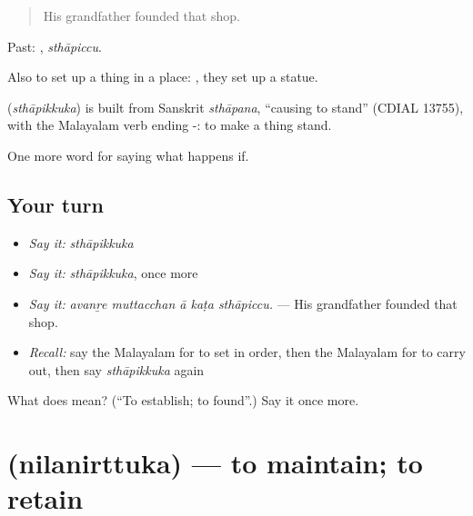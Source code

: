 \begin{quote}
His grandfather founded that shop.
\end{quote}

Past: , \emph{sthāpiccu}.

Also to set up a thing in a place:  , they set up a statue.

\begin{cousinweb}
\textbf{} (\emph{sthāpikkuka}) is built from Sanskrit \emph{sthāpana}, \textquotedblleft{}causing to stand\textquotedblright{} (CDIAL 13755), with the Malayalam verb ending -: to make a thing stand.
\end{cousinweb}

\begin{grammarlens}[title={What you've built}]
One more word for saying what happens if.
\end{grammarlens}

\subsection*{Your turn}
\begin{itemize}
\raggedright
  \item \emph{Say it:} \emph{sthāpikkuka}
  \item \emph{Say it:} \emph{sthāpikkuka}, once more
  \item \emph{Say it:} \emph{avanṟe muttacchan ā kaṭa sthāpiccu.} — His grandfather founded that shop.
  \item \emph{Recall:} say the Malayalam for to set in order, then the Malayalam for to carry out, then say \emph{sthāpikkuka} again
\end{itemize}

\begin{tcolorbox}[breakable,colback=teal!4,colframe=teal!35!black,title={Before you move on}]
What does  mean? (\textquotedblleft{}To establish; to found\textquotedblright{}.) Say it once more.
\end{tcolorbox}
\section[\texorpdfstring{\ml{നിലനിർത്തുക} (nilanirttuka)}{നിലനിർത്തുക (nilanirttuka)}]{ (nilanirttuka) — to maintain; to retain}

\label{lesson:ML-C457-nilanirttuka}



